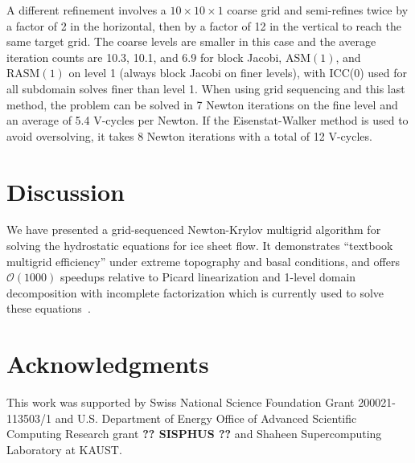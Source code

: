 \documentclass[3p]{elsarticle}
\newcommand{\ASM}{\mathrm{ASM}}
\newcommand{\RASM}{\mathrm{RASM}}
\newcommand{\bigO}{{\mathcal{O}}}
\begin{document}
A different refinement involves a $10\times 10\times 1$ coarse grid and semi-refines twice by a factor of 2 in the horizontal, then by a factor of 12 in the vertical to reach the same target grid.  The coarse levels are smaller in this case and the average iteration counts are 10.3, 10.1, and 6.9 for block Jacobi, $\ASM(1)$, and $\RASM(1)$ on level 1 (always block Jacobi on finer levels), with ICC(0) used for all subdomain solves finer than level 1.  When using grid sequencing and this last method, the problem can be solved in 7 Newton iterations on the fine level and an average of 5.4 V-cycles per Newton. If the Eisenstat-Walker method is used to avoid oversolving, it takes 8 Newton iterations with a total of 12 V-cycles.

\section{Discussion}
We have presented a grid-sequenced Newton-Krylov multigrid algorithm for solving the hydrostatic equations for ice sheet flow.  It demonstrates ``textbook multigrid efficiency'' under extreme topography and basal conditions, and offers $\bigO(1000)$ speedups relative to Picard linearization and 1-level domain decomposition with incomplete factorization which is currently used to solve these equations~\cite{seacism,issm,johnson2007modeling,desmedt2010using,pattyn2003ntd}.

\nonumber\section{Acknowledgments} This work was supported by Swiss National Science Foundation Grant 200021-113503/1
and U.S. Department of Energy Office of Advanced Scientific Computing Research grant {\bf ?? SISPHUS ??} and Shaheen Supercomputing Laboratory at KAUST.



\end{document}
